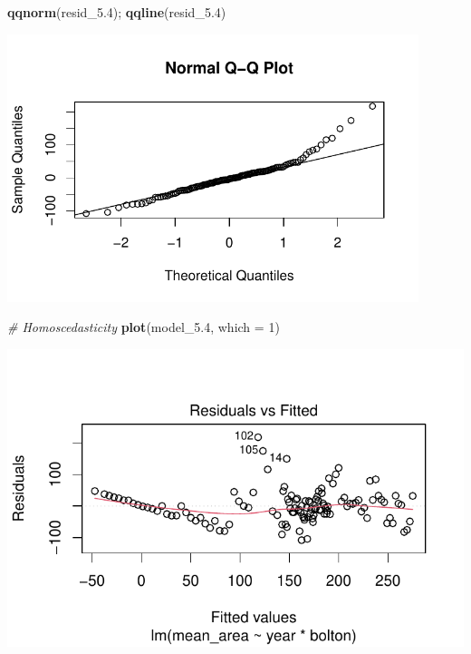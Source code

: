 \documentclass[
  british,
  10pt,
]{article}
\newenvironment{Shaded}{\begin{snugshade}}{\end{snugshade}}
\newcommand{\AttributeTok}[1]{\textcolor[rgb]{0.13,0.29,0.53}{#1}}
\newcommand{\CommentTok}[1]{\textcolor[rgb]{0.56,0.35,0.01}{\textit{#1}}}
\newcommand{\DecValTok}[1]{\textcolor[rgb]{0.00,0.00,0.81}{#1}}
\newcommand{\FloatTok}[1]{\textcolor[rgb]{0.00,0.00,0.81}{#1}}
\newcommand{\FunctionTok}[1]{\textcolor[rgb]{0.13,0.29,0.53}{\textbf{#1}}}
\newcommand{\NormalTok}[1]{#1}
\begin{document}
\begin{Shaded}
\begin{Highlighting}[]
\FunctionTok{qqnorm}\NormalTok{(resid\_5}\FloatTok{.4}\NormalTok{); }\FunctionTok{qqline}\NormalTok{(resid\_5}\FloatTok{.4}\NormalTok{)}
\end{Highlighting}
\end{Shaded}

\begin{center}
\includegraphics[width=12cm,height=\textheight,keepaspectratio]{BCB744_Biostats_Prac_Exam_2025_files/figure-pdf/chunk20-2.pdf}
\end{center}

\begin{Shaded}
\begin{Highlighting}[]
\CommentTok{\# Homoscedasticity}
\FunctionTok{plot}\NormalTok{(model\_5}\FloatTok{.4}\NormalTok{, }\AttributeTok{which =} \DecValTok{1}\NormalTok{)}
\end{Highlighting}
\end{Shaded}

\begin{center}
\includegraphics[width=0.6\linewidth,height=\textheight,keepaspectratio]{BCB744_Biostats_Prac_Exam_2025_files/figure-pdf/chunk20-3.pdf}
\end{center}
\end{document}
